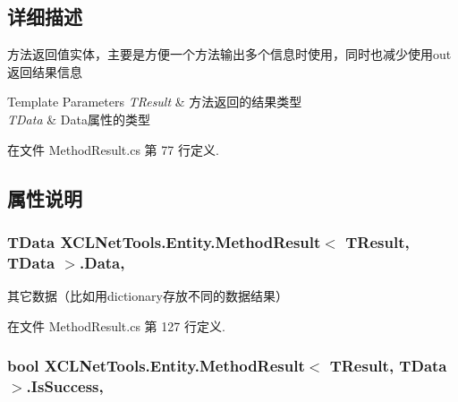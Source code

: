 \subsection{详细描述}
方法返回值实体，主要是方便一个方法输出多个信息时使用，同时也减少使用out返回结果信息 


\begin{DoxyTemplParams}{Template Parameters}
{\em T\-Result} & 方法返回的结果类型\\
\hline
{\em T\-Data} & Data属性的类型\\
\hline
\end{DoxyTemplParams}


在文件 Method\-Result.\-cs 第 77 行定义.



\subsection{属性说明}
\hypertarget{class_x_c_l_net_tools_1_1_entity_1_1_method_result_3_01_t_result_00_01_t_data_01_4_a61973d8192cd072de16f5f132c2e9ff2}{
\subsubsection[{Data}]{\setlength{\rightskip}{0pt plus 5cm}T\-Data X\-C\-L\-Net\-Tools.\-Entity.\-Method\-Result$<$ T\-Result, T\-Data $>$.Data\hspace{0.3cm}{\ttfamily [get]}, {\ttfamily [set]}}}\label{class_x_c_l_net_tools_1_1_entity_1_1_method_result_3_01_t_result_00_01_t_data_01_4_a61973d8192cd072de16f5f132c2e9ff2}


其它数据（比如用dictionary存放不同的数据结果） 



在文件 Method\-Result.\-cs 第 127 行定义.

\hypertarget{class_x_c_l_net_tools_1_1_entity_1_1_method_result_3_01_t_result_00_01_t_data_01_4_a562911ed4e73a529dca6d2f10f774597}{
\subsubsection[{Is\-Success}]{\setlength{\rightskip}{0pt plus 5cm}bool X\-C\-L\-Net\-Tools.\-Entity.\-Method\-Result$<$ T\-Result, T\-Data $>$.Is\-Success\hspace{0.3cm}{\ttfamily [get]}, {\ttfamily [set]}}}\label{class_x_c_l_net_tools_1_1_entity_1_1_method_result_3_01_t_result_00_01_t_data_01_4_a562911ed4e73a529dca6d2f10f774597}


